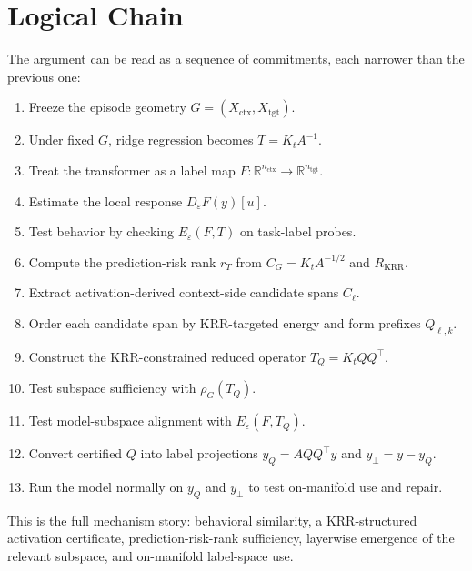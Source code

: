 \documentclass[11pt]{article}
\newcommand{\R}{\mathbb{R}}
\begin{document}
\section{Logical Chain}

The argument can be read as a sequence of commitments, each narrower than the previous one:

\begin{enumerate}[label=\arabic*.]
\item Freeze the episode geometry \(G=(X_{\mathrm{ctx}},X_{\mathrm{tgt}})\).
\item Under fixed \(G\), ridge regression becomes \(T=K_tA^{-1}\).
\item Treat the transformer as a label map \(F:\R^{n_{\mathrm{ctx}}}\to\R^{n_{\mathrm{tgt}}}\).
\item Estimate the local response \(D_\varepsilon F(y)[u]\).
\item Test behavior by checking \(E_\varepsilon(F,T)\) on task-label probes.
\item Compute the prediction-risk rank \(r_T\) from \(C_G=K_tA^{-1/2}\) and \(R_{\mathrm{KRR}}\).
\item Extract activation-derived context-side candidate spans \(C_\ell\).
\item Order each candidate span by KRR-targeted energy and form prefixes \(Q_{\ell,k}\).
\item Construct the KRR-constrained reduced operator \(T_Q=K_tQQ^\top\).
\item Test subspace sufficiency with \(\rho_G(T_Q)\).
\item Test model-subspace alignment with \(E_\varepsilon(F,T_Q)\).
\item Convert certified \(Q\) into label projections \(y_Q=AQQ^\top y\) and \(y_\perp=y-y_Q\).
\item Run the model normally on \(y_Q\) and \(y_\perp\) to test on-manifold use and repair.
\end{enumerate}

This is the full mechanism story: behavioral similarity, a KRR-structured activation certificate,
prediction-risk-rank sufficiency, layerwise emergence of the relevant subspace, and on-manifold
label-space use.
\end{document}
